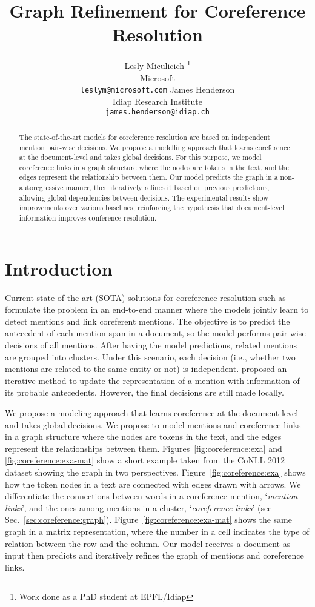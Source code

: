 \documentclass[11pt]{article}
\title{Graph Refinement for Coreference Resolution}
\author{Lesly Miculicich \thanks{\hspace{2mm}Work done as a PhD student at EPFL/Idiap}  \\ Microsoft \\ \texttt{leslym@microsoft.com} 
        \And James Henderson \\ Idiap Research Institute  \\ \texttt{james.henderson@idiap.ch}}
\begin{document}
\maketitle
\begin{abstract}
The state-of-the-art models for coreference resolution are based on independent mention pair-wise decisions. We propose a modelling approach that learns coreference at the document-level and takes global decisions. For this purpose, we model coreference links in a graph structure where the nodes are tokens in the text, and the edges represent the relationship between them. Our model predicts the graph in a non-autoregressive manner, then iteratively refines it based on previous predictions, allowing global dependencies between decisions. The experimental results show improvements over various baselines, reinforcing the hypothesis that document-level information improves conference resolution. \end{abstract}

\section{Introduction} 
\label{sec:coreference:intro}



Current state-of-the-art (SOTA) solutions for coreference resolution such as \cite{toshniwal-etal-2020-learning, xu-choi-2020-revealing, wu-etal-2020-corefqa} formulate the problem in an end-to-end manner where the models jointly learn to detect mentions and link coreferent mentions. The objective is to predict the antecedent of each mention-span in a document, so the model performs pair-wise decisions of all mentions. After having the model predictions, related mentions are grouped into clusters. Under this scenario, each decision (i.e., whether two mentions are related to the same entity or not) is independent.
\citet{lee-etal-2018-higher} proposed an iterative method to update the representation of a mention with information of its probable antecedents. However, the final decisions are still made locally. 

We propose a modeling approach that learns coreference at the document-level and takes global decisions. We propose to model mentions and coreference links in a graph structure where the nodes are tokens in the text, and the edges represent the relationships between them. Figures~\ref{fig:coreference:exa} and \ref{fig:coreference:exa-mat} show a short example taken from the CoNLL 2012 dataset \cite{pradhan-etal-2012-conll} showing the graph in two perspectives. Figure~\ref{fig:coreference:exa} shows how the token nodes in a text are connected with edges drawn with arrows. We differentiate the connections between words in a coreference mention, `\emph{mention links}', and the ones among mentions in a cluster, `\emph{coreference links}' (see Sec.~\ref{sec:coreference:graph}). Figure~\ref{fig:coreference:exa-mat} shows the same graph in a matrix representation, where the number in a cell indicates the type of relation between the row and the column. Our model receives a document as input then predicts and iteratively refines the graph of mentions and coreference links.
\end{document}
